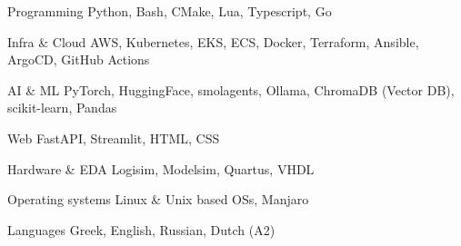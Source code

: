 


\begin{cvskills}


\cvskill
{Programming} %
{Python, Bash, CMake, Lua, Typescript, Go} %


\cvskill
{Infra \& Cloud} %
{AWS, Kubernetes, EKS, ECS, Docker, Terraform, Ansible, ArgoCD, GitHub Actions} %


\cvskill
{AI \& ML} %
{PyTorch, HuggingFace, smolagents, Ollama, ChromaDB (Vector DB), scikit-learn, Pandas} %


\cvskill
{Web} %
{FastAPI, Streamlit, HTML, CSS} %


\cvskill
{Hardware \& EDA} %
{Logisim, Modelsim, Quartus, VHDL} %


\cvskill
{Operating systems} %
{Linux \& Unix based OSs, Manjaro} %


\cvskill
{Languages} %
{Greek, English, Russian, Dutch (A2)} %

\end{cvskills}
